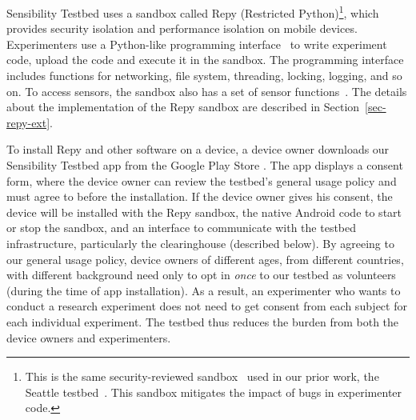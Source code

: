 Sensibility Testbed uses a sandbox called Repy (Restricted 
Python)\footnote{\scriptsize This is the 
same security-reviewed sandbox~\cite{cappos2010retaining} used in
our prior work, the Seattle testbed~\cite{seattle}. This sandbox
mitigates the impact of bugs in experimenter code.}, which 
provides security isolation and performance isolation on mobile devices.
Experimenters use a Python-like programming interface~\cite{repyv2}
to write experiment code, upload the code and execute it in the
sandbox. The programming interface includes functions for networking, 
file system, threading, locking, logging, and so on. To access sensors, 
the sandbox also has a set of sensor functions~\cite{sensors}. The
details about the implementation of the Repy sandbox are described 
in Section~\ref{sec-repy-ext}.

To install Repy and other software on a device, a device owner downloads 
our Sensibility Testbed app from the Google Play Store \cite{sensibility-app}.
The app displays a consent form,  where the device owner can review
the testbed's general usage policy  and must 
agree to before the installation. If the device owner gives his
consent, the device will be installed with the Repy sandbox, the native Android code to 
start or stop the sandbox, and an interface to communicate with the testbed 
infrastructure, particularly the clearinghouse (described below). 
By agreeing to our general usage policy, device 
owners of different ages, from different countries, with different
background need only to opt in \textit{once} to our testbed as 
volunteers (during the time of app installation). As a result, an 
experimenter who wants to conduct a research experiment 
does not need to get consent from each subject for each individual
experiment. The testbed thus reduces the burden from both the 
device owners and experimenters. 

